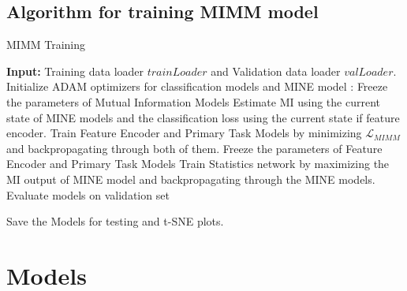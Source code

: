 \documentclass[12pt,DIV14,BCOR12mm,a4paper,footinclude=false,headinclude,parskip=half-,twoside,openright,cleardoublepage=empty,toc=index,bibliography=totoc,listof=totoc]{scrreprt}
\numberwithin{equation}{chapter}
\begin{document}
\section{Algorithm for training MIMM model}
\begin{algorithm}[H]
\caption{MIMM Training}
\label{alg:training}
\begin{algorithmic}[1]
\State \textbf{Input:} Training data loader $trainLoader$ and Validation data loader $valLoader$.
\State Initialize ADAM optimizers for classification models and MINE model
:
            \State Freeze the parameters of Mutual Information Models
            \State Estimate MI using the current state of MINE models and the classification loss using the current state if feature encoder.
            \State Train Feature Encoder and Primary Task Models by minimizing $\mathcal{L}_{MIMM}$ and backpropagating through both of them.
        \EndFor
            \State Freeze the parameters of Feature Encoder and Primary Task Models
            \State Train Statistics network by maximizing the MI output of MINE model and backpropagating through the MINE models. 
        \EndFor
    \EndFor
    \State Evaluate models on validation set
\EndFor

\State Save the Models for testing and t-SNE plots.

\end{algorithmic}
\end{algorithm}


\chapter{Models}
\end{document}
